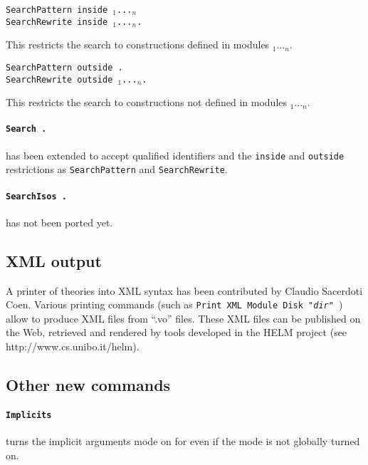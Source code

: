 \documentclass[11pt]{article}
\begin{document}
\begin{Variants}

\item {\tt SearchPattern {\term} inside {\module$_1$}...{\module$_n$}}\\
{\tt SearchRewrite {\term} inside
{\module$_1$}...{\module$_n$}.}

  This restricts the search to constructions defined in modules {\module$_1$}...{\module$_n$}.

\item {\tt SearchPattern {\term} outside {\module}.}\\
{\tt SearchRewrite {\term} outside {\module$_1$}...{\module$_n$}.}

  This restricts the search to constructions not defined in modules {\module$_1$}...{\module$_n$}.

\end{Variants}

\paragraph{{\tt Search {\ident}.}} has been extended to accept qualified
identifiers and the {\tt inside} and {\tt outside} restrictions as
{\tt SearchPattern} and {\tt SearchRewrite}.

\paragraph{{\tt SearchIsos {\term}.}} has not been ported yet.

\subsection{XML output}
\label{XML}

A printer of {\Coq} theories into XML syntax has been contributed by
Claudio Sacerdoti Coen. Various printing commands (such as {\tt Print
XML Module Disk "{\it dir}" {\ident}}) allow to produce XML files from
``.vo'' files. These XML files can be published on the Web, retrieved
and rendered by tools developed in the HELM project (see
http://www.cs.unibo.it/helm).

\subsection{Other new commands}


  \paragraph{{\tt Implicits {\ident}}} turns the implicit arguments
  mode on for {\ident} even if the mode is not globally turned on.
\end{document}
